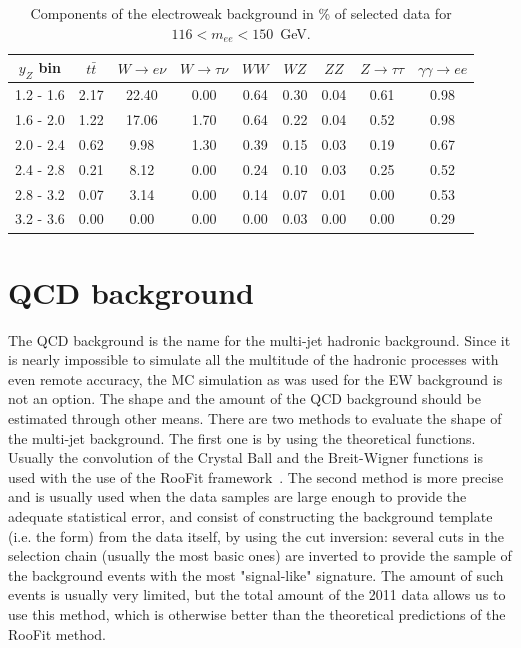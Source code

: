\begin{table}
\centering
\begin{tabular}{ c cccccccc } \hline \hline
 $y_Z$ bin & $t\bar t$ & $W \to e\nu$ & $W \to \tau\nu$ &  $WW$ & $WZ$ & $ZZ$ & $Z \to \tau\tau$  & $\gamma\gamma \to ee$\\  \hline
 1.2 -  1.6 &   2.17 &  22.40 &   0.00 &   0.64 &   0.30 &   0.04 &   0.61 &   0.98 \\
 1.6 -  2.0 &   1.22 &  17.06 &   1.70 &   0.64 &   0.22 &   0.04 &   0.52 &   0.98 \\
 2.0 -  2.4 &   0.62 &   9.98 &   1.30 &   0.39 &   0.15 &   0.03 &   0.19 &   0.67 \\
 2.4 -  2.8 &   0.21 &   8.12 &   0.00 &   0.24 &   0.10 &   0.03 &   0.25 &   0.52 \\
 2.8 -  3.2 &   0.07 &   3.14 &   0.00 &   0.14 &   0.07 &   0.01 &   0.00 &   0.53 \\
 3.2 -  3.6 &   0.00 &   0.00 &   0.00 &   0.00 &   0.03 &   0.00 &   0.00 &   0.29 \\
\hline \hline
\end{tabular}
\caption{Components of the electroweak background in \% of selected data for $116 < m_{ee} < 150$~GeV.}
\label{tab:bkg_ew_high}
\end{table}

\section{QCD background}

The QCD background is the name for the multi-jet hadronic background. Since it is nearly impossible to simulate all the multitude of the hadronic processes with even remote accuracy, the MC simulation as was used for the EW background is not an option. The shape and the amount of the QCD background should be estimated through other means. There are two methods to evaluate the shape of the multi-jet background. The first one is by using the theoretical functions. Usually the convolution of the Crystal Ball and the Breit-Wigner functions is used with the use of the RooFit framework~\cite{lib:bkg_roofit}. The second method is more precise and is usually used when the data samples are large enough to provide the adequate statistical error, and consist of constructing the background template (i.e. the form) from the data itself, by using the cut inversion: several cuts in the selection chain (usually the most basic ones) are inverted to provide the sample of the background events with the most "signal-like" signature. The amount of such events is usually very limited, but the total amount of the 2011 data allows us to use this method, which is otherwise better than the theoretical predictions of the RooFit method.

